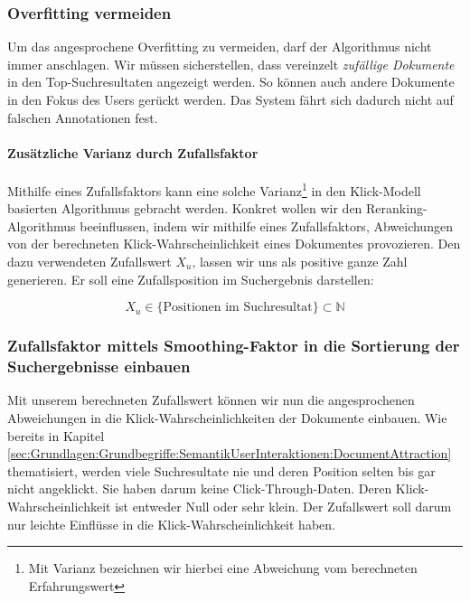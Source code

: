 \subsubsection{Overfitting vermeiden}
\label{sec:Reranking:Methodik:Vergessen:Overfitting}

Um das angesprochene Overfitting zu vermeiden, darf der Algorithmus nicht immer anschlagen. Wir müssen sicherstellen, dass vereinzelt \textit{zufällige Dokumente} in den \glqq Top-Suchresultaten\grqq{} angezeigt werden. So können auch andere Dokumente in den Fokus des Users gerückt werden. Das System fährt sich dadurch nicht auf falschen Annotationen fest. 

\paragraph{Zusätzliche Varianz durch Zufallsfaktor} 
Mithilfe eines Zufallsfaktors kann eine solche Varianz\footnote{Mit Varianz bezeichnen wir hierbei eine Abweichung vom berechneten Erfahrungswert} in den Klick-Modell basierten Algorithmus gebracht werden. Konkret wollen wir den Reranking-Algorithmus beeinflussen, indem wir mithilfe eines Zufallsfaktors, Abweichungen von der berechneten Klick-Wahrscheinlichkeit eines Dokumentes provozieren. Den dazu verwendeten Zufallswert $X_{u}$,  lassen wir uns als positive ganze Zahl generieren. Er soll eine Zufallsposition im Suchergebnis darstellen:

\vspace{-1.75em}
\begin{equation}	
	X_{u} \in \lbrace \text{Positionen im Suchresultat} \rbrace \subset \mathbb{N}
\end{equation}
\vspace{-1.5em}

\subsubsection{Zufallsfaktor mittels Smoothing-Faktor in 	die Sortierung der Suchergebnisse einbauen}
\label{sec:Reranking:Methodik:Vergessen:ZufallsfaktorSmoothing}

Mit unserem berechneten Zufallswert können wir nun die angesprochenen Abweichungen in die Klick-Wahrscheinlichkeiten der Dokumente einbauen. Wie bereits in Kapitel \ref{sec:Grundlagen:Grundbegriffe:SemantikUserInteraktionen:DocumentAttraction} thematisiert, werden viele Suchresultate nie und deren Position selten bis gar nicht angeklickt. Sie haben darum keine Click-Through-Daten. Deren Klick-Wahrscheinlichkeit ist entweder Null oder sehr klein. Der Zufallswert soll darum nur leichte Einflüsse in die Klick-Wahrscheinlichkeit haben.

